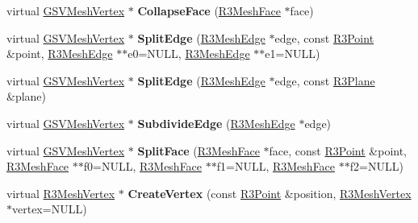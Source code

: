 \begin{DoxyCompactItemize}
\item 
virtual \hyperlink{class_g_s_v_mesh_vertex}{G\+S\+V\+Mesh\+Vertex} $\ast$ {\bfseries Collapse\+Face} (\hyperlink{class_r3_mesh_face}{R3\+Mesh\+Face} $\ast$face)\hypertarget{class_g_s_v_mesh_aa023f776cfd9c6046b602b7a31eac216}{}\label{class_g_s_v_mesh_aa023f776cfd9c6046b602b7a31eac216}

\item 
virtual \hyperlink{class_g_s_v_mesh_vertex}{G\+S\+V\+Mesh\+Vertex} $\ast$ {\bfseries Split\+Edge} (\hyperlink{class_r3_mesh_edge}{R3\+Mesh\+Edge} $\ast$edge, const \hyperlink{class_r3_point}{R3\+Point} \&point, \hyperlink{class_r3_mesh_edge}{R3\+Mesh\+Edge} $\ast$$\ast$e0=N\+U\+LL, \hyperlink{class_r3_mesh_edge}{R3\+Mesh\+Edge} $\ast$$\ast$e1=N\+U\+LL)\hypertarget{class_g_s_v_mesh_aef8080a94f153225f77b793f74f888c8}{}\label{class_g_s_v_mesh_aef8080a94f153225f77b793f74f888c8}

\item 
virtual \hyperlink{class_g_s_v_mesh_vertex}{G\+S\+V\+Mesh\+Vertex} $\ast$ {\bfseries Split\+Edge} (\hyperlink{class_r3_mesh_edge}{R3\+Mesh\+Edge} $\ast$edge, const \hyperlink{class_r3_plane}{R3\+Plane} \&plane)\hypertarget{class_g_s_v_mesh_aa2c1c78345b1f19febf5f102f452e4d4}{}\label{class_g_s_v_mesh_aa2c1c78345b1f19febf5f102f452e4d4}

\item 
virtual \hyperlink{class_g_s_v_mesh_vertex}{G\+S\+V\+Mesh\+Vertex} $\ast$ {\bfseries Subdivide\+Edge} (\hyperlink{class_r3_mesh_edge}{R3\+Mesh\+Edge} $\ast$edge)\hypertarget{class_g_s_v_mesh_a25e6e1790db8fdd6b8025e1bd8d48fb4}{}\label{class_g_s_v_mesh_a25e6e1790db8fdd6b8025e1bd8d48fb4}

\item 
virtual \hyperlink{class_g_s_v_mesh_vertex}{G\+S\+V\+Mesh\+Vertex} $\ast$ {\bfseries Split\+Face} (\hyperlink{class_r3_mesh_face}{R3\+Mesh\+Face} $\ast$face, const \hyperlink{class_r3_point}{R3\+Point} \&point, \hyperlink{class_r3_mesh_face}{R3\+Mesh\+Face} $\ast$$\ast$f0=N\+U\+LL, \hyperlink{class_r3_mesh_face}{R3\+Mesh\+Face} $\ast$$\ast$f1=N\+U\+LL, \hyperlink{class_r3_mesh_face}{R3\+Mesh\+Face} $\ast$$\ast$f2=N\+U\+LL)\hypertarget{class_g_s_v_mesh_a9de7be7a3fb017fb02a362debbb72367}{}\label{class_g_s_v_mesh_a9de7be7a3fb017fb02a362debbb72367}

\item 
virtual \hyperlink{class_r3_mesh_vertex}{R3\+Mesh\+Vertex} $\ast$ {\bfseries Create\+Vertex} (const \hyperlink{class_r3_point}{R3\+Point} \&position, \hyperlink{class_r3_mesh_vertex}{R3\+Mesh\+Vertex} $\ast$vertex=N\+U\+LL)\hypertarget{class_g_s_v_mesh_ab463d9a27c032686d21fac9f37baa54d}{}\label{class_g_s_v_mesh_ab463d9a27c032686d21fac9f37baa54d}


\end{DoxyCompactItemize}
